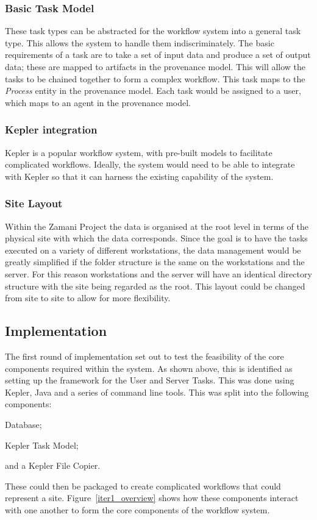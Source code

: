 \subsubsection*{Basic Task Model}
These task types can be abstracted for the workflow system into a general
task type. This allows the system to handle them indiscriminately. The basic
requirements of a task are to take a set of input data and produce a set
of output data; these are mapped to artifacts in the provenance model.
This will allow the tasks to be chained together to form
a complex workflow. This task maps to the \emph{Process} entity in the
provenance model. Each task would be assigned to a user, which
maps to an agent in the provenance model.

\subsubsection*{Kepler integration}
Kepler is a popular workflow system, with pre-built models to
facilitate complicated workflows. Ideally, the system would need to be able
to integrate with Kepler so that it can harness the existing capability
of the system.

\subsubsection*{Site Layout}
Within the Zamani Project the data is organised at the root level in terms of
the physical site with which the data corresponds. Since the goal is to have the
tasks executed on a variety of different workstations, the data management
would be greatly simplified if the folder structure is the same on the workstations
and the server. For this reason workstations and the server will have
an identical directory structure with the site being regarded as the root. This
layout could be changed from site to site to allow for more flexibility.

\subsection{Implementation}

The first round of implementation set out to test the feasibility of the
core components required within the system. As shown above, this is identified
as setting up the framework for the User and Server Tasks. This was done using
Kepler, Java and a series of command line tools. This was split into the following
components: \begin{inparaenum}[(i)] \item Database; \item Kepler Task Model;
\item and a Kepler File Copier. \end{inparaenum} These could then be packaged
to create complicated workflows that could represent a site.
Figure~\ref{iter1_overview} shows how these components interact with one another to form the core components of the workflow system.

